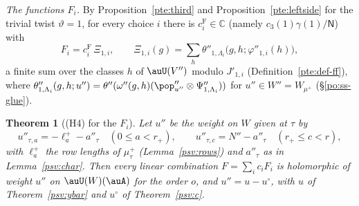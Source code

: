 \documentclass[10pt]{amsart}
\newtheorem{theorem}{Theorem}[section]
\theoremstyle{definition}
\theoremstyle{remark}
\newcommand{\C}{\mathbb C}
\begin{document}
\emph{The functions $F_i$.} By Proposition~\ref{pte:third} and Proposition~\ref{pte:leftside} for the trivial twist
$\vartheta=1$, for every choice $i$ there is $c_i^{\mathrm F}\in\C$ (namely $c_3(1)\gamma(1)/\mathsf N$) with
\begin{equation}\label{psv:eq-F}
F_i=c_i^{\mathrm F}\,\Xi_{1,i},\qquad\Xi_{1,i}(g)=\sum_{h}\theta''_{1,\Lambda_i}\bigl(g,h;\varphi''_{1,i}(h)\bigr),
\end{equation}
a finite sum over the classes $h$ of $\auU(V'')$ modulo $J'_{1,i}$ (Definition~\ref{pte:def-ff}), where
$\theta''_{1,\Lambda_i}(g,h;u'')=\theta''(\omega''(g,h)(\pop''_{u''}\otimes\Psi''_{1,\Lambda_i}))$ for $u''\in W''=W_{\mu^+}$
(\S\ref{po:ss-glue}).

\begin{theorem}[(H4) for the $F_i$]\label{psv:F}
Let $u''$ be the weight on $W$ given at $\tau$ by
\[
u''_{\tau,a}=-\ell^+_a-a''_\tau\quad(0\le a<r_+),\qquad u''_{\tau,c}=N''-a''_\tau\quad(r_+\le c<r),
\]
with $\ell^+_a$ the row lengths of $\mu^+_\tau$ \textup(Lemma~\ref{psv:rows}\textup) and $a''_\tau$ as in
Lemma~\ref{psv:char}. Then every linear combination $F=\sum_ic_iF_i$ is holomorphic of weight $u''$ on
$\auU(W)(\auA)$ for the order $o$, and $u''=u-u^\circ$, with $u$ of Theorem~\ref{psv:ybar} and $u^\circ$ of
Theorem~\ref{psv:c}.
\end{theorem}
\end{document}
